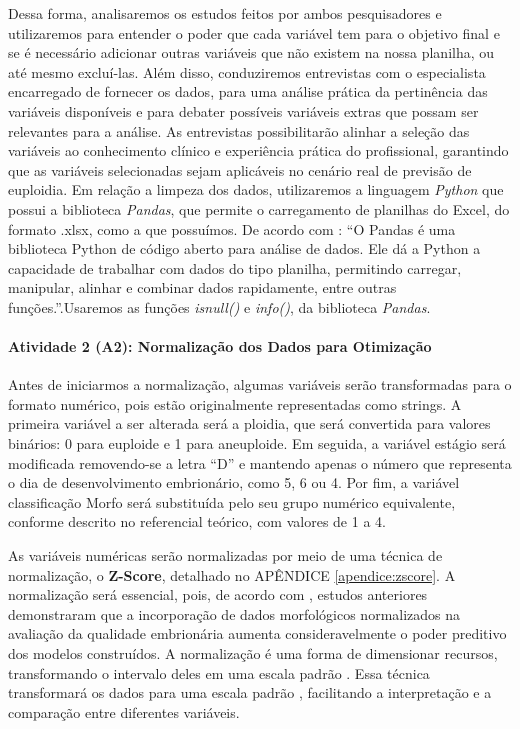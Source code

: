 Dessa forma, analisaremos os estudos feitos por ambos pesquisadores e utilizaremos para entender o poder que cada variável tem para o objetivo final e se é necessário adicionar outras variáveis que não existem na nossa planilha, ou até mesmo excluí-las. Além disso, conduziremos entrevistas com o especialista encarregado de fornecer os dados, para uma análise prática da pertinência das variáveis disponíveis e para debater possíveis variáveis extras que possam ser relevantes para a análise. As entrevistas possibilitarão alinhar a seleção das variáveis ao conhecimento clínico e experiência prática do profissional, garantindo que as variáveis selecionadas sejam aplicáveis no cenário real de previsão de euploidia. Em relação a limpeza dos dados, utilizaremos a linguagem \textit{Python} que possui a biblioteca \textit{Pandas}, que permite o carregamento de planilhas do Excel, do formato .xlsx, como a que possuímos. De acordo com : “O Pandas é uma biblioteca Python de código aberto para análise de dados. Ele dá a Python a capacidade de trabalhar com dados do tipo planilha, permitindo carregar, manipular, alinhar e combinar dados rapidamente, entre outras funções.”.Usaremos as funções \textit{isnull()} e \textit{info()}, da biblioteca \textit{Pandas}.

\paragraph{\textbf{Atividade 2 (A2):} Normalização dos Dados para Otimização}

Antes de iniciarmos a normalização, algumas variáveis serão transformadas para o formato numérico, pois estão originalmente representadas como strings. A primeira variável a ser alterada será a ploidia, que será convertida para valores binários: 0 para euploide e 1 para aneuploide. Em seguida, a variável estágio será modificada removendo-se a letra “D” e mantendo apenas o número que representa o dia de desenvolvimento embrionário, como 5, 6 ou 4. Por fim, a variável classificação Morfo será substituída pelo seu grupo numérico equivalente, conforme descrito no referencial teórico, com valores de 1 a 4.

As variáveis numéricas serão normalizadas por meio de uma técnica de normalização, o \textbf{Z-Score}, detalhado no APÊNDICE \ref{apendice:zscore}. A normalização será essencial, pois, de acordo com , estudos anteriores demonstraram que a incorporação de dados morfológicos normalizados na avaliação da qualidade embrionária aumenta consideravelmente o poder preditivo dos modelos construídos. A normalização é uma forma de dimensionar recursos, transformando o intervalo deles em uma escala padrão \cite{jaiswal2024}. Essa técnica transformará os dados para uma escala padrão \cite{jaiswal2024}, facilitando a interpretação e a comparação entre diferentes variáveis.

